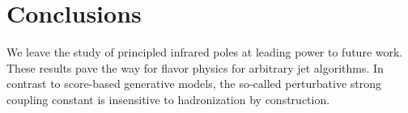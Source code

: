 \section{Conclusions}\label{sec:conclusions}

We leave the study of principled infrared poles at leading power to
future work. These results pave the way for flavor physics for arbitrary
jet algorithms. In contrast to score-based generative models, the
so-called perturbative strong coupling constant is insensitive to
hadronization by construction.

